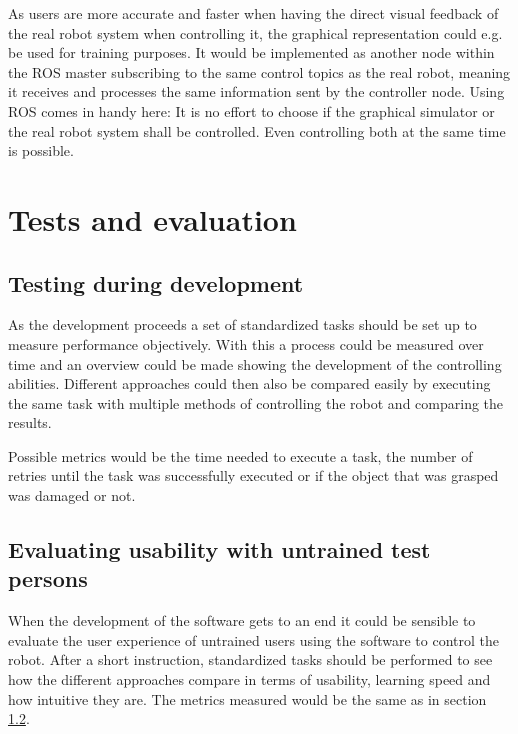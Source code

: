 \documentclass[a4paper]{article}
\begin{document}
As users are more accurate and faster when having the direct visual feedback of the real robot system when controlling it\cite{conf/humanoids/TohHLBZP12}, the graphical representation could e.g. be used for training purposes. It would be implemented as another node within the ROS master subscribing to the same control topics as the real robot, meaning it receives and processes the same information sent by the controller node. Using ROS comes in handy here: It is no effort to choose if the graphical simulator or the real robot system shall be controlled. Even controlling both at the same time is possible.

\section{Tests and evaluation}

\subsection{Testing during development}

As the development proceeds a set of standardized tasks should be set up to measure performance objectively. With this a process could be measured over time and an overview could be made showing the development of the controlling abilities. Different approaches could then also be compared easily by executing the same task with multiple methods of controlling the robot and comparing the results.

Possible metrics would be the time needed to execute a task, the number of retries until the task was successfully executed or if the object that was grasped was damaged or not.

\subsection{Evaluating usability with untrained test persons}
\label{sec:testdev}
When the development of the software gets to an end it could be sensible to evaluate the user experience of untrained users using the software to control the robot. After a short instruction, standardized tasks should be performed to see how the different approaches compare in terms of usability, learning speed and how intuitive they are. The metrics measured would be the same as in section \ref{sec:testdev}.

\pagebreak


\printbibliography
\end{document}
